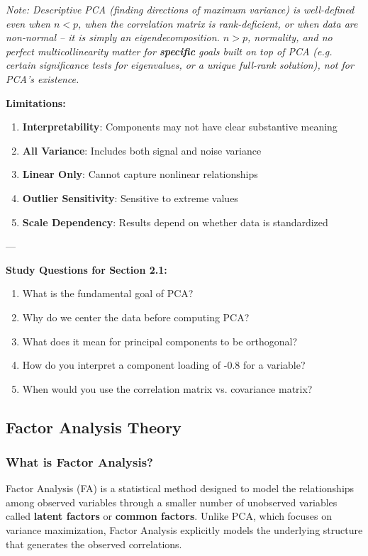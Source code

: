 \documentclass[
]{article}
\begin{document}
\emph{Note: Descriptive PCA (finding directions of maximum variance) is
well-defined even when \(n < p\), when the correlation matrix is
rank-deficient, or when data are non-normal -- it is simply an
eigendecomposition. \(n > p\), normality, and no perfect
multicollinearity matter for \textbf{specific} goals built on top of PCA
(e.g. certain significance tests for eigenvalues, or a unique full-rank
solution), not for PCA's existence.}

\textbf{Limitations:}

\begin{enumerate}
\item
  \textbf{Interpretability}: Components may not have clear substantive
  meaning
\item
  \textbf{All Variance}: Includes both signal and noise variance
\item
  \textbf{Linear Only}: Cannot capture nonlinear relationships
\item
  \textbf{Outlier Sensitivity}: Sensitive to extreme values
\item
  \textbf{Scale Dependency}: Results depend on whether data is
  standardized
\end{enumerate}

---

\textbf{Study Questions for Section 2.1:}

\begin{enumerate}
\item
  What is the fundamental goal of PCA?
\item
  Why do we center the data before computing PCA?
\item
  What does it mean for principal components to be orthogonal?
\item
  How do you interpret a component loading of -0.8 for a variable?
\item
  When would you use the correlation matrix vs. covariance matrix?
\end{enumerate}

\subsection{Factor Analysis Theory}

\subsubsection{What is Factor Analysis?}

Factor Analysis (FA) is a statistical method designed to model the
relationships among observed variables through a smaller number of
unobserved variables called \textbf{latent factors} or \textbf{common
factors}. Unlike PCA, which focuses on variance maximization, Factor
Analysis explicitly models the underlying structure that generates the
observed correlations.
\end{document}
